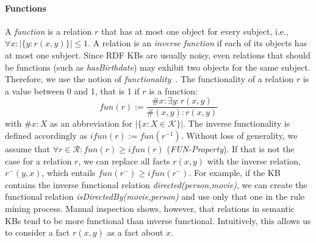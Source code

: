 \paragraph{Functions} A \emph{function} is a relation $r$ that has at most one object for every subject, i.e., $\forall x: |\{y: r(x,y)\}| \leq 1$. A relation is an \emph{inverse function} if each of its objects has at most one subject. Since RDF KBs are usually noisy, even relations that should be functions (such as \emph{hasBirthdate}) may exhibit two objects for the same subject. Therefore, we use the notion of \emph{functionality}~\cite{paris}. The functionality of a relation $r$ is a value between 0 and 1, that is 1 if $r$ is a function:
\[fun(r) := \frac{\#x: \exists y: r(x,y)}{\#(x,y): r(x,y)}\]
with  $\#x:X$ as an abbreviation for $|\{x: X \in \mathcal{K}\}|$. The inverse functionality is defined accordingly as $ifun(r):=fun(r^{-1})$.
Without loss of generality, we assume that $\forall r \in \mathcal{R}: fun(r)\geq ifun(r)$ (\emph{FUN-Property}). 
If that is not the case for a relation $r$, we can replace all facts $r(x,y)$ with the inverse relation, $r^-(y,x)$, which entails $fun(r^-)\geq ifun(r^-)$. 
For example, if the KB contains the inverse functional relation \emph{directed(person,movie)}, we can create the functional relation \emph{isDirectedBy(movie,person)} and use only that one in the rule mining process.
Manual inspection shows, however, that relations in semantic KBs tend to be more functional than inverse functional. Intuitively, this allows us to consider a fact $r(x,y)$ as a fact about $x$.

